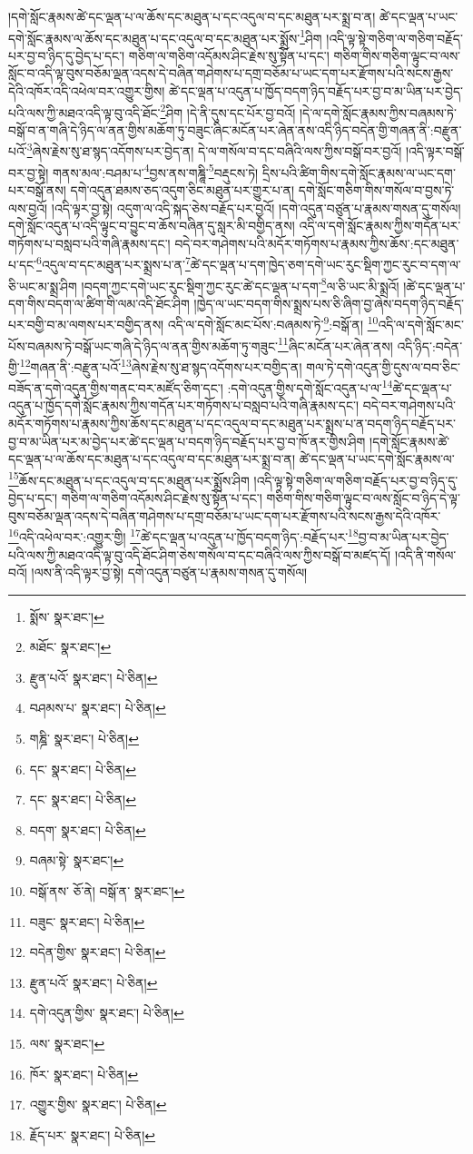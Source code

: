 །དགེ་སློང་རྣམས་ཚེ་དང་ལྡན་པ་ལ་ཆོས་དང་མཐུན་པ་དང་འདུལ་བ་དང་མཐུན་པར་སྨྲ་བ་ན། ཚེ་དང་ལྡན་པ་ཡང་དགེ་སློང་རྣམས་ལ་ཆོས་དང་མཐུན་པ་དང་འདུལ་བ་དང་མཐུན་པར་སྨྲོས་\footnote{སྨོས་  སྣར་ཐང་། }ཤིག །འདི་ལྟ་སྟེ་གཅིག་ལ་གཅིག་བརྗོད་པར་བྱ་བ་ཉིད་དུ་བྱེད་པ་དང་། གཅིག་ལ་གཅིག་འདོམས་ཤིང་རྗེས་སུ་སྟོན་པ་དང་། གཅིག་གིས་གཅིག་ལྟུང་བ་ལས་སློང་བ་འདི་ལྟ་བུས་བཅོམ་ལྡན་འདས་དེ་བཞིན་གཤེགས་པ་དགྲ་བཅོམ་པ་ཡང་དག་པར་རྫོགས་པའི་སངས་རྒྱས་དེའི་འཁོར་འདི་འཕེལ་བར་འགྱུར་གྱིས། ཚེ་དང་ལྡན་པ་འདུན་པ་ཁྱོད་བདག་ཉིད་བརྗོད་པར་བྱ་བ་མ་ཡིན་པར་བྱེད་པའི་ལས་ཀྱི་མཐའ་འདི་ལྟ་བུ་འདི་ཐོང་\footnote{མཐོང་  སྣར་ཐང་། }ཤིག །དེ་ནི་དུས་དང་པོར་བྱ་བའོ། །དེ་ལ་དགེ་སློང་རྣམས་ཀྱིས་བཞམས་ཏེ་བསྒོ་བ་ན་གཞི་དེ་ཉིད་ལ་ནན་གྱིས་མཆོག་ཏུ་བཟུང་ཞིང་མངོན་པར་ཞེན་ནས་འདི་ཉིད་བདེན་གྱི་གཞན་ནི་:བརྫུན་པའོ་\footnote{རྫུན་པའོ་  སྣར་ཐང་།  པེ་ཅིན། }ཞེས་རྗེས་སུ་ཐ་སྙད་འདོགས་པར་བྱེད་ན། དེ་ལ་གསོལ་བ་དང་བཞིའི་ལས་ཀྱིས་བསྒོ་བར་བྱའོ། །འདི་ལྟར་བསྒོ་བར་བྱ་སྟེ། གནས་མལ་:བཤམ་པ་\footnote{བཤམས་པ་  སྣར་ཐང་།  པེ་ཅིན། }བྱས་ནས་གཎྜཱི་\footnote{གཎྜི་  སྣར་ཐང་།  པེ་ཅིན། }བརྡུངས་ཏེ། དྲིས་པའི་ཚིག་གིས་དགེ་སློང་རྣམས་ལ་ཡང་དག་པར་བསྒོ་ནས། དགེ་འདུན་ཐམས་ཅད་འདུག་ཅིང་མཐུན་པར་གྱུར་པ་ན། དགེ་སློང་གཅིག་གིས་གསོལ་བ་བྱས་ཏེ་ལས་བྱའོ། །འདི་ལྟར་བྱ་སྟེ། འདུག་ལ་འདི་སྐད་ཅེས་བརྗོད་པར་བྱའོ། །དགེ་འདུན་བཙུན་པ་རྣམས་གསན་དུ་གསོལ། དགེ་སློང་འདུན་པ་འདི་ལྟུང་བ་བྱུང་བ་ཆོས་བཞིན་དུ་སླར་མི་བགྱིད་ནས། འདི་ལ་དགེ་སློང་རྣམས་ཀྱིས་གདོན་པར་གཏོགས་པ་བསླབ་པའི་གཞི་རྣམས་དང་། བདེ་བར་གཤེགས་པའི་མདོར་གཏོགས་པ་རྣམས་ཀྱིས་ཆོས་:དང་མཐུན་པ་དང་\footnote{དང་  སྣར་ཐང་།  པེ་ཅིན། }འདུལ་བ་དང་མཐུན་པར་སྨྲས་པ་ན་\footnote{དང་  སྣར་ཐང་།  པེ་ཅིན། }ཚེ་དང་ལྡན་པ་དག་ཁྱེད་ཅག་དགེ་ཡང་རུང་སྡིག་ཀྱང་རུང་བ་དག་ལ་ཅི་ཡང་མ་སྨྲ་ཤིག །བདག་ཀྱང་དགེ་ཡང་རུང་སྡིག་ཀྱང་རུང་ཚེ་དང་ལྡན་པ་དག་\footnote{བདག་  སྣར་ཐང་།  པེ་ཅིན། }ལ་ཅི་ཡང་མི་སྨྲའོ། །ཚེ་དང་ལྡན་པ་དག་གིས་བདག་ལ་ཚིག་གི་ལམ་འདི་ཐོང་ཤིག །ཁྱེད་ལ་ཡང་བདག་གིས་སྨྲས་པས་ཅི་ཞིག་བྱ་ཞེས་བདག་ཉིད་བརྗོད་པར་བགྱི་བ་མ་ལགས་པར་བགྱིད་ནས། འདི་ལ་དགེ་སློང་མང་པོས་:བཞམས་ཏེ་\footnote{བཞམ་སྟེ་  སྣར་ཐང་། }:བསྒོ་ན། \footnote{བསྒོ་ནས་  ཅོ་ནེ། བསྒོ་ན་  སྣར་ཐང་། }འདི་ལ་དགེ་སློང་མང་པོས་བཞམས་ཏེ་བསྒོ་ཡང་གཞི་དེ་ཉིད་ལ་ནན་གྱིས་མཆོག་ཏུ་གཟུང་\footnote{བཟུང་  སྣར་ཐང་།  པེ་ཅིན། }ཞིང་མངོན་པར་ཞེན་ནས། འདི་ཉིད་:བདེན་གྱི་\footnote{བདེན་གྱིས་  སྣར་ཐང་།  པེ་ཅིན། }གཞན་ནི་:བརྫུན་པའོ་\footnote{རྫུན་པའོ་  སྣར་ཐང་།  པེ་ཅིན། }ཞེས་རྗེས་སུ་ཐ་སྙད་འདོགས་པར་བགྱིད་ན། གལ་ཏེ་དགེ་འདུན་གྱི་དུས་ལ་བབ་ཅིང་བཟོད་ན་དགེ་འདུན་གྱིས་གནང་བར་མཛོད་ཅིག་དང་། :དགེ་འདུན་གྱིས་དགེ་སློང་འདུན་པ་ལ་\footnote{དགེ་འདུན་གྱིས་  སྣར་ཐང་།  པེ་ཅིན། }ཚེ་དང་ལྡན་པ་འདུན་པ་ཁྱོད་དགེ་སློང་རྣམས་ཀྱིས་གདོན་པར་གཏོགས་པ་བསླབ་པའི་གཞི་རྣམས་དང་། བདེ་བར་གཤེགས་པའི་མདོར་གཏོགས་པ་རྣམས་ཀྱིས་ཆོས་དང་མཐུན་པ་དང་འདུལ་བ་དང་མཐུན་པར་སྨྲས་པ་ན་བདག་ཉིད་བརྗོད་པར་བྱ་བ་མ་ཡིན་པར་མ་བྱེད་པར་ཚེ་དང་ལྡན་པ་བདག་ཉིད་བརྗོད་པར་བྱ་བ་ཁོ་ནར་གྱིས་ཤིག །དགེ་སློང་རྣམས་ཚེ་དང་ལྡན་པ་ལ་ཆོས་དང་མཐུན་པ་དང་འདུལ་བ་དང་མཐུན་པར་སྨྲ་བ་ན། ཚེ་དང་ལྡན་པ་ཡང་དགེ་སློང་རྣམས་ལ་\footnote{ལས་  སྣར་ཐང་། }ཆོས་དང་མཐུན་པ་དང་འདུལ་བ་དང་མཐུན་པར་སྨྲོས་ཤིག །འདི་ལྟ་སྟེ་གཅིག་ལ་གཅིག་བརྗོད་པར་བྱ་བ་ཉིད་དུ་བྱེད་པ་དང་། གཅིག་ལ་གཅིག་འདོམས་ཤིང་རྗེས་སུ་སྟོན་པ་དང་། གཅིག་གིས་གཅིག་ལྟུང་བ་ལས་སློང་བ་ཉིད་དེ་ལྟ་བུས་བཅོམ་ལྡན་འདས་དེ་བཞིན་གཤེགས་པ་དགྲ་བཅོམ་པ་ཡང་དག་པར་རྫོགས་པའི་སངས་རྒྱས་དེའི་འཁོར་\footnote{ཁོར་  སྣར་ཐང་།  པེ་ཅིན། }འདི་འཕེལ་བར་:འགྱུར་གྱི། \footnote{འགྱུར་གྱིས་  སྣར་ཐང་།  པེ་ཅིན། }ཚེ་དང་ལྡན་པ་འདུན་པ་ཁྱོད་བདག་ཉིད་:བརྗོད་པར་\footnote{རྗོད་པར་  སྣར་ཐང་།  པེ་ཅིན། }བྱ་བ་མ་ཡིན་པར་བྱེད་པའི་ལས་ཀྱི་མཐའ་འདི་ལྟ་བུ་འདི་ཐོང་ཤིག་ཅེས་གསོལ་བ་དང་བཞིའི་ལས་ཀྱིས་བསྒོ་བ་མཛད་དོ། །འདི་ནི་གསོལ་བའོ། །ལས་ནི་འདི་ལྟར་བྱ་སྟེ། དགེ་འདུན་བཙུན་པ་རྣམས་གསན་དུ་གསོལ། 